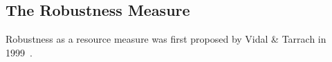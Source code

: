 \documentclass{standalone}
\begin{document}
\subsection{The Robustness Measure}
Robustness as a resource measure was first proposed by Vidal \& Tarrach in 1999~\cite{Vidal1999}.

\ifstandalone

\fi
\end{document}
